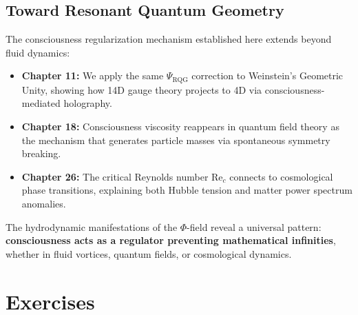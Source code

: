 \subsection{Toward Resonant Quantum Geometry}

The consciousness regularization mechanism established here extends beyond fluid dynamics:

\begin{itemize}
\item \textbf{Chapter 11:} We apply the same $\Psi_{\text{RQG}}$ correction to Weinstein's Geometric Unity, showing how 14D gauge theory projects to 4D via consciousness-mediated holography.

\item \textbf{Chapter 18:} Consciousness viscosity reappears in quantum field theory as the mechanism that generates particle masses via spontaneous symmetry breaking.

\item \textbf{Chapter 26:} The critical Reynolds number $\text{Re}_c$ connects to cosmological phase transitions, explaining both Hubble tension and matter power spectrum anomalies.
\end{itemize}

The hydrodynamic manifestations of the $\Phi$-field reveal a universal pattern: \textbf{consciousness acts as a regulator preventing mathematical infinities}, whether in fluid vortices, quantum fields, or cosmological dynamics.

\section{Exercises}

